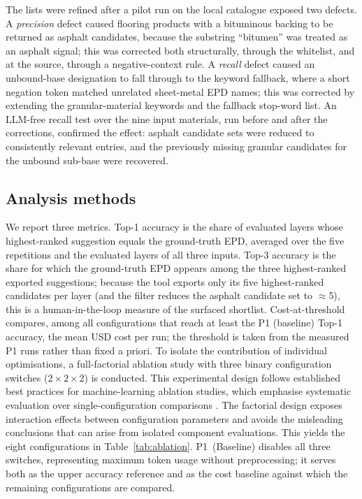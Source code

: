 \documentclass[10pt, a4paper, twocolumn]{article}
\begin{document}
The lists were refined after a pilot run on the local catalogue exposed two defects.
A \emph{precision} defect caused flooring products with a bituminous backing to be
returned as asphalt candidates, because the substring ``bitumen'' was treated as an
asphalt signal; this was corrected both structurally, through the whitelist, and at the
source, through a negative-context rule. A \emph{recall} defect caused an unbound-base
designation to fall through to the keyword fallback, where a short negation token
matched unrelated sheet-metal EPD names; this was corrected by extending the
granular-material keywords and the fallback stop-word list. An LLM-free recall test over
the nine input materials, run before and after the corrections, confirmed the effect:
asphalt candidate sets were reduced to consistently relevant entries, and the previously
missing granular candidates for the unbound sub-base were recovered.

\subsection{Analysis methods}

We report three metrics. Top-1 accuracy is the share of evaluated layers whose highest-ranked suggestion equals the ground-truth EPD, averaged over the five repetitions and the evaluated layers of all three inputs. Top-3 accuracy is the share for which the ground-truth EPD appears among the three highest-ranked exported suggestions; because the tool exports only its five highest-ranked candidates per layer (and the filter reduces the asphalt candidate set to $\approx$5), this is a human-in-the-loop measure of the surfaced shortlist. Cost-at-threshold compares, among all configurations that reach at least the P1 (baseline) Top-1 accuracy, the mean USD cost per run; the threshold is taken from the measured P1 runs rather than fixed a priori.
To isolate the contribution of individual optimisations, a full-factorial ablation
study with three binary configuration switches ($2\times2\times2$) is conducted. This
experimental design follows established best practices for machine-learning ablation
studies, which emphasise systematic evaluation over single-configuration comparisons \cite{Fostiropoulos.2023}\cite{Meyes.2019}. The factorial design exposes
interaction effects between configuration parameters and avoids the misleading
conclusions that can arise from isolated component evaluations. This yields the eight
configurations in Table~\ref{tab:ablation}. P1~(Baseline) disables all three switches,
representing maximum token usage without preprocessing; it serves both as the upper
accuracy reference and as the cost baseline against which the remaining configurations
are compared.
\end{document}
